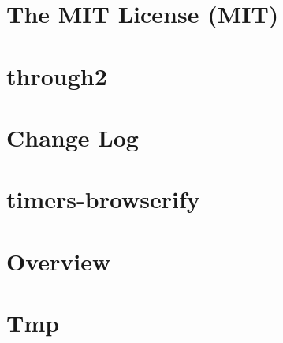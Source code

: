 \documentclass[twoside]{book}
\newcommand{\+}{\discretionary{\mbox{\scriptsize$\hookleftarrow$}}{}{}}
\begin{document}
\chapter{The M\+IT License (M\+IT)}
\label{md_dsmacc_examples_DRmerge_node_modules_through2_LICENSE}

\chapter{through2}
\label{md_dsmacc_examples_DRmerge_node_modules_through2_README}

\chapter{Change Log}
\label{md_dsmacc_examples_DRmerge_node_modules_timers-browserify_CHANGELOG}

\chapter{timers-\/browserify}
\label{md_dsmacc_examples_DRmerge_node_modules_timers-browserify_LICENSE}

\chapter{Overview}
\label{md_dsmacc_examples_DRmerge_node_modules_timers-browserify_README}

\chapter{Tmp}
\label{md_dsmacc_examples_DRmerge_node_modules_tmp_README}

\end{document}
